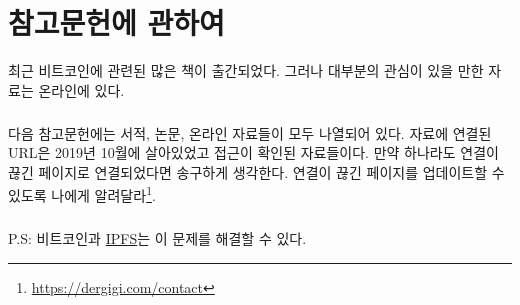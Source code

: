 \chapter*{참고문헌에 관하여}

최근 비트코인에 관련된 많은 책이 출간되었다. 그러나 대부분의 관심이 있을 만한 자료는 온라인에 있다.

\paragraph{}
다음 참고문헌에는 서적, 논문, 온라인 자료들이 모두 나열되어 있다.
자료에 연결된 URL은 2019년 10월에 살아있었고 접근이 확인된 자료들이다. 
만약 하나라도 연결이 끊긴 페이지로 연결되었다면 송구하게 생각한다.
연결이 끊긴 페이지를 업데이트할 수 있도록 나에게 알려달라\footnote{\url{https://dergigi.com/contact}}.

\paragraph{}
P.S: 비트코인과 \href{https://ipfs.io/}{IPFS}는 이 문제를 해결할 수 있다.